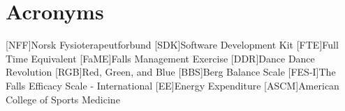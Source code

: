 \chapter*{Acronyms}
\begin{acronym}
[NFF]{Norsk Fysioterapeutforbund}
[SDK]{Software Development Kit}
[FTE]{Full Time Equivalent}
[FaME]{Falls Management Exercise}
[DDR]{Dance Dance Revolution}
[RGB]{Red, Green, and Blue}
[BBS]{Berg Balance Scale}
[FES-I]{The Falls Efficacy Scale - International}
[EE]{Energy Expenditure} 
[ASCM]{American College of Sports Medicine} 
\end{acronym}

